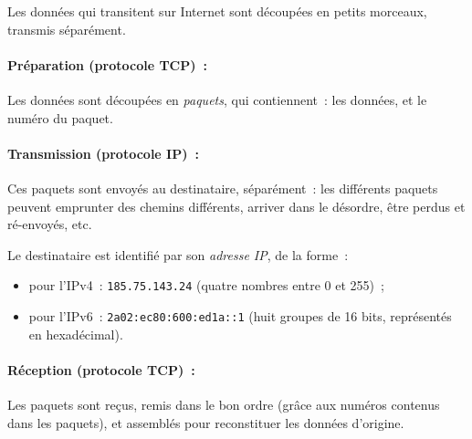 \documentclass[11pt]{article}
\begin{document}
Les données qui transitent sur Internet sont découpées en petits morceaux, transmis séparément.

\paragraph{Préparation (protocole TCP) :} Les données sont découpées en \emph{paquets}, qui contiennent : les données, et le numéro du paquet.

\paragraph{Transmission (protocole IP) :} Ces paquets sont envoyés au destinataire, séparément : les différents paquets peuvent emprunter des chemins différents, arriver dans le désordre, être perdus et ré-envoyés, etc.

Le destinataire est identifié par son \emph{adresse IP}, de la forme :
\begin{itemize}
  \item pour l'IPv4 : \texttt{185.75.143.24} (quatre nombres entre 0 et 255) ;
  \item pour l'IPv6 : \texttt{2a02:ec80:600:ed1a::1} (huit groupes de 16 bits, représentés en hexadécimal).
  \end{itemize}

\paragraph{Réception (protocole TCP) :} Les paquets sont reçus, remis dans le bon ordre (grâce aux numéros contenus dans les paquets), et assemblés pour reconstituer les données d'origine.
\end{document}
